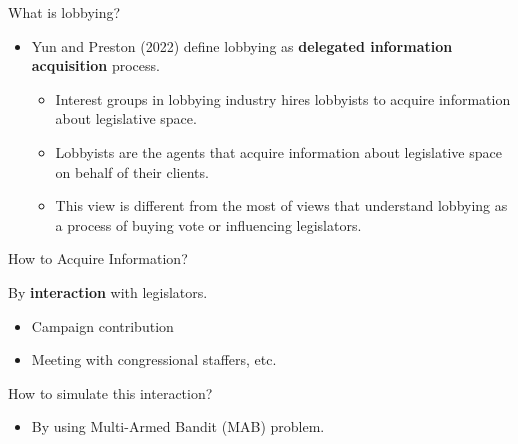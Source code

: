\documentclass{beamer}
\begin{document}
	\begin{frame}{What is lobbying?}
		\begin{itemize}
			\item Yun and Preston (2022) define lobbying as \textbf{delegated information acquisition} process.
			\begin{itemize}
				\item Interest groups in lobbying industry hires lobbyists to acquire information about legislative space.
				\item Lobbyists are the agents that acquire information about legislative space on behalf of their clients.		
				\item This view is different from the most of views that understand lobbying as a process of buying vote or influencing legislators.
			\end{itemize}
		\end{itemize}
	\end{frame}


	\begin{frame}{How to Acquire Information?}
		\begin{itemize}{
			\item By \textbf{interaction} with legislators.
				\begin{itemize}
					\item Campaign contribution
					\item Meeting with congressional staffers, etc.
				\end{itemize}
			\item How to simulate this interaction?
				 \begin{itemize}
					\item By using Multi-Armed Bandit (MAB) problem.
				\end{itemize}}
		\end{itemize}
	\end{frame}
\end{document}
